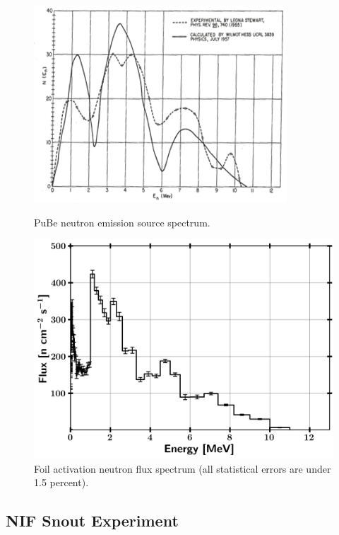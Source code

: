 \documentclass[journal]{IEEEtran}
\let\MYoriglatexcaption\caption
\renewcommand{\caption}[2][\relax]{\MYoriglatexcaption[#2]{#2}}
\begin{document}
\begin{figure}[h!]
\includegraphics[width=\linewidth]{Figures/PuBe.png}
\caption{PuBe neutron emission source spectrum.}
\label{fig:PuBE}

\vskip 0.25cm

\includegraphics[width=\linewidth]{Figures/PileSpec.png}
\caption{Foil activation neutron flux spectrum (all statistical errors are under 1.5 percent).}
\label{fig:Spec1}
\end{figure}


\subsection{NIF Snout Experiment}
\end{document}
